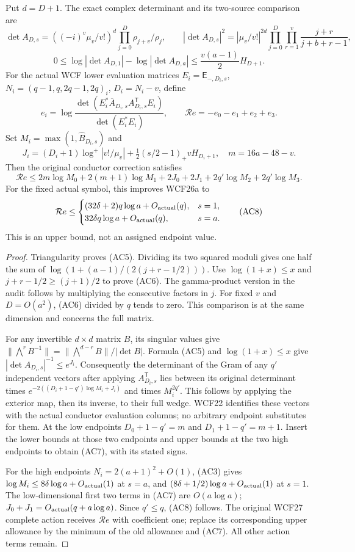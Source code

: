 \begin{hzocproposition}
Put $d=D+1$. The exact complex determinant and its two-source comparison are
\[
 \det A_{D,s}=((-i)^v\mu_v/v!)^d\prod_{j=0}^D\rho_{j+v}/\rho_j,
 \qquad
 |\det A_{D,s}|^2=|\mu_v/v!|^{2d}
 \prod_{j=0}^D\prod_{r=1}^v\frac{j+r}{j+b+r-1},\tag{AC5}
\]
\[
 0\le\log|\det A_{D,1}|-\log|\det A_{D,a}|
 \le\frac{v(a-1)}2 H_{D+1}.\tag{AC6}
\]
For the actual WCF lower evaluation matrices $E_i=\mathsf E_{-,D_i,s}$,
$N_i=(q-1,q,2q-1,2q)_i$, $D_i=N_i-v$, define
\[
 e_i=\log\frac{\det(E_i^*\overline A_{D_i,s}A_{D_i,s}^{\mathsf T}E_i)}
 {\det(E_i^*E_i)},\qquad \mathcal R e=-e_0-e_1+e_2+e_3.
\]
Set $M_i=\max(1,\widehat B_{D_i,s})$ and
\[
 J_i=(D_i+1)\log^+|v!/\mu_v|
       +\tfrac12(s/2-1)_+vH_{D_i+1},\quad m=16a-48-v.
\]
Then the original conductor correction satisfies
\[
 \mathcal R e\le
 2m\log M_0+2(m+1)\log M_1+2J_0+2J_1
 +2q'\log M_2+2q'\log M_3.\tag{AC7}
\]
For the fixed actual symbol, this improves WCF26a to
\[
 \mathcal R e\le
 \begin{cases}
 (32\delta+2)q\log a+O_{\rm actual}(q),&s=1,\\
 32\delta q\log a+O_{\rm actual}(q),&s=a.
 \end{cases}\tag{AC8}
\]
This is an upper bound, not an assigned endpoint value.
\end{hzocproposition}
\begin{proof}
Triangularity proves (AC5). Dividing its two squared moduli gives
one half the sum of
$\log(1+(a-1)/(2(j+r-1/2)))$. Use $\log(1+x)\le x$ and
$j+r-1/2\ge(j+1)/2$ to prove (AC6). The gamma-product version in
the audit follows by multiplying the consecutive factors in $j$.
For fixed $v$ and $D=O(a^2)$, (AC6) divided by $q$ tends to zero.
This comparison is at the same dimension and concerns the full matrix.

For any invertible $d\times d$ matrix $B$, its singular values give
$\|\bigwedge^rB^{-1}\|=\|\bigwedge^{d-r}B\|/|\det B|$.
Formula (AC5) and $\log(1+x)\le x$ give
$|\det A_{D_i,s}|^{-1}\le e^{J_i}$. Consequently the determinant
of the Gram of any $q'$ independent vectors after applying
$A_{D_i,s}^{\mathsf T}$ lies between its original determinant times
$e^{-2((D_i+1-q')\log M_i+J_i)}$ and times $M_i^{2q'}$.
This follows by applying the exterior map, then its inverse, to their
full wedge. WCF22 identifies these vectors with the actual conductor
evaluation columns; no arbitrary endpoint substitutes for them.
At the low endpoints $D_0+1-q'=m$ and $D_1+1-q'=m+1$.
Insert the lower bounds at those two endpoints and upper bounds at the
two high endpoints to obtain (AC7), with its stated signs.

For the high endpoints $N_i=2(a+1)^2+O(1)$, (AC3) gives
$\log M_i\le8\delta\log a+O_{\rm actual}(1)$ at $s=a$, and
$(8\delta+1/2)\log a+O_{\rm actual}(1)$ at $s=1$.
The low-dimensional first two terms in (AC7) are $O(a\log a)$;
$J_0+J_1=O_{\rm actual}(q+a\log a)$. Since $q'\le q$, (AC8)
follows. The original WCF27 complete action receives $\mathcal R e$
with coefficient one; replace its corresponding upper allowance by
the minimum of the old allowance and (AC7). All other action terms remain.
\end{proof}

